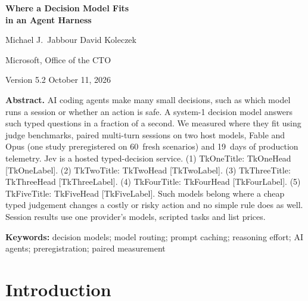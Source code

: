\documentclass[11pt,letterpaper]{article}
\newcommand{\TkTitle}[1]{\csname Tk#1Title\endcsname}
\newcommand{\TkHead}[1]{\csname Tk#1Head\endcsname}
\newcommand{\TkLabel}[1]{\textsf{\small\color{okblue!70!black}[\csname Tk#1Label\endcsname]}}
\newcommand{\ObDays}{19}
\newcommand{\SOnePanelN}{60}
\begin{document}
\thispagestyle{plain}
\begin{center}
  {\LARGE\sffamily\bfseries Where a Decision Model Fits\\[3pt] in an Agent Harness\par}
  \vspace{10pt}
  {\large Michael J.\ Jabbour \qquad David Koleczek\par}
  \vspace{3pt}
  {\normalsize Microsoft, Office of the CTO\par}
  \vspace{3pt}
  {\normalsize Version 5.2 \textperiodcentered{} October 11, 2026\par}
\end{center}
\vspace{4pt}
\begin{center}\begin{minipage}{0.93\textwidth}\small
\noindent\textbf{Abstract.} %
AI coding agents make many small decisions, such as which model runs a session or whether an action is safe. A system-1 decision model answers such typed questions in a fraction of a second. We measured where they
fit using judge benchmarks, paired multi-turn sessions on two host models, Fable and Opus (one study preregistered on
\SOnePanelN\ fresh scenarios) and \ObDays\ days of production telemetry. Jev is a hosted typed-decision service.
(1) \TkTitle{One}: \TkHead{One} \TkLabel{One}. (2) \TkTitle{Two}: \TkHead{Two}
\TkLabel{Two}. (3) \TkTitle{Three}: \TkHead{Three} \TkLabel{Three}. (4) \TkTitle{Four}: \TkHead{Four}
\TkLabel{Four}. (5) \TkTitle{Five}: \TkHead{Five} \TkLabel{Five}. Such models belong where a cheap typed judgement
changes a costly or risky action and no simple rule does as well. Session results use one
provider's models, scripted tasks and list prices.
 \par\smallskip\noindent\textbf{Keywords:} decision models; model routing; prompt caching; reasoning effort; AI agents;
preregistration; paired measurement
\end{minipage}\end{center}
\section{Introduction}\label{sec:intro}
\end{document}
